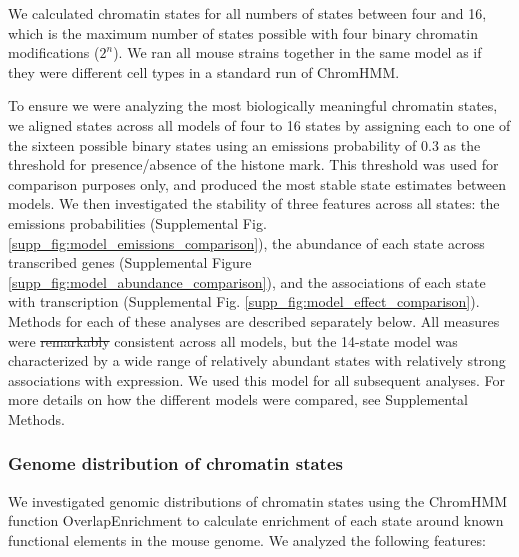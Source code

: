 \documentclass[
  11pt,
]{article}
\providecommand{\DIFdeltex}[1]{{\protect\color{red}\sout{#1}}}                      %
\providecommand{\DIFdelbegin}{} %
\providecommand{\DIFdelend}{} %
\providecommand{\DIFdel}[1]{\texorpdfstring{\DIFdeltex{#1}}{}} %
\newcommand{\DIFscaledelfig}{0.5}
\newlength{\DIFdelgraphicswidth} %
\newlength{\DIFdelgraphicsheight} %
\newcommand{\DIFdelincludegraphics}[2][]{%
\sbox{\DIFdelgraphicsbox}{\DIFOincludegraphics[#1]{#2}}%
\settoboxwidth{\DIFdelgraphicswidth}{\DIFdelgraphicsbox} %
\settoboxtotalheight{\DIFdelgraphicsheight}{\DIFdelgraphicsbox} %
\scalebox{\DIFscaledelfig}{%
\parbox[b]{\DIFdelgraphicswidth}{\usebox{\DIFdelgraphicsbox}\\[-\baselineskip] \rule{\DIFdelgraphicswidth}{0em}}\llap{\resizebox{\DIFdelgraphicswidth}{\DIFdelgraphicsheight}{%
\setlength{\unitlength}{\DIFdelgraphicswidth}%
\begin{picture}(1,1)%
\thicklines\linethickness{2pt} %
{\color[rgb]{1,0,0}\put(0,0){\framebox(1,1){}}}%
{\color[rgb]{1,0,0}\put(0,0){\line( 1,1){1}}}%
{\color[rgb]{1,0,0}\put(0,1){\line(1,-1){1}}}%
\end{picture}%
}\hspace*{3pt}}} %
} %
\DeclareRobustCommand{\DIFdelbegin}{\DIFOdelbegin \let\includegraphics\DIFdelincludegraphics} %
\DeclareRobustCommand{\DIFdelend}{\DIFOaddend \let\includegraphics\DIFOincludegraphics} %
\begin{document}
We calculated chromatin states for all numbers of states between four
and 16, which is the maximum number of states possible with four binary
chromatin modifications (\(2^n\)). We ran all mouse strains together in
the same model as if they were different cell types in a standard run of
ChromHMM.

To ensure we were analyzing the most biologically meaningful chromatin
states, we aligned states across all models of four to 16 states by
assigning each to one of the sixteen possible binary states using an
emissions probability of 0.3 as the threshold for presence/absence of
the histone mark. This threshold was used for comparison purposes only,
and produced the most stable state estimates between models. We then
investigated the stability of three features across all states: the
emissions probabilities (Supplemental Fig.
\ref{supp_fig:model_emissions_comparison}), the abundance of each state
across transcribed genes (Supplemental Figure
\ref{supp_fig:model_abundance_comparison}), and the associations of each
state with transcription (Supplemental Fig.
\ref{supp_fig:model_effect_comparison}). Methods for each of these
analyses are described separately below. All measures were \DIFdelbegin \DIFdel{remarkably
}\DIFdelend consistent
across all models, but the 14-state model was characterized by a wide
range of relatively abundant states with relatively strong associations
with expression. We used this model for all subsequent analyses. For
more details on how the different models were compared, see Supplemental
Methods.

\hypertarget{genome-distribution-of-chromatin-states}{%
\subsubsection{Genome distribution of chromatin
states}\label{genome-distribution-of-chromatin-states}}

We investigated genomic distributions of chromatin states using the
ChromHMM function OverlapEnrichment to calculate enrichment of each
state around known functional elements in the mouse genome. We analyzed
the following features:
\end{document}
